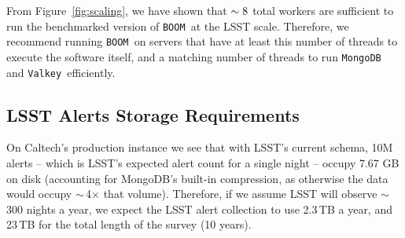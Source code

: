 \documentclass[twocolumn]{aastex631}
\newcommand{\boom}{\texttt{BOOM }}
\newcommand{\valkey}{\texttt{Valkey }}
\newcommand{\mongo}{\texttt{MongoDB }}
\begin{document}
From Figure~\ref{fig:scaling}, we have shown that $\sim 8$ total workers are sufficient to run the benchmarked version of \boom at the LSST scale.
Therefore, we recommend running \boom on servers that have at least this number of threads to execute the software itself,
and a matching number of threads to run \mongo and \valkey efficiently.

\subsection{LSST Alerts Storage Requirements}

On Caltech's production instance we see that with LSST's current schema, 10M alerts -- which is LSST's expected alert count for a single night -- occupy 7.67 GB on disk (accounting for MongoDB's built-in compression, as otherwise the data would occupy $\sim$\,4$\times$ that volume). Therefore, if we assume LSST will observe $\sim$300 nights a year, we expect the LSST alert collection to use 2.3\,TB a year, and 23\,TB for the total length of the survey (10 years).

\end{document}

